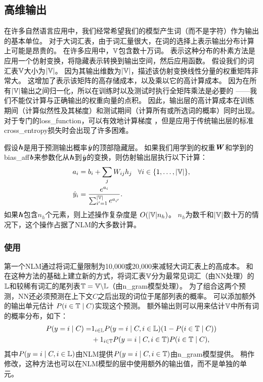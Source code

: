 \subsection{高维输出}
\label{sec:high_dimensional_outputs}

在许多自然语言应用中，我们经常希望我们的模型产生词（而不是字符）作为输出的基本单位。
对于大词汇表，由于词汇量很大，在词的选择上表示输出分布计算上可能是昂贵的。
在许多应用中，$\mathbb{V}$包含数十万词。
表示这种分布的朴素方法是应用一个仿射变换，将隐藏表示转换到输出空间，然后应用函数。
假设我们的词汇表$\mathbb{V}$大小为$| \mathbb{V} |$。
因为其输出维数为$| \mathbb{V} |$，描述该仿射变换线性分量的权重矩阵非常大。
这增加了表示该矩阵的高存储成本，以及乘以它的高计算成本。
因为在所有$| \mathbb{V} |$输出之间归一化，所以在训练时以及测试时执行全矩阵乘法是必要的 ——我们不能仅计算与正确输出的权重向量的点积。
因此，输出层的高计算成本在训练期间（计算似然性及其梯度）和测试期间（计算所有或所选词的概率）同时出现。
对于专门的\gls{loss_function}，可以有效地计算梯度 \citep{Vincent2015}，但是应用于传统输出层的标准\gls{cross_entropy}损失时会出现了许多困难。

假设$\boldsymbol{\mathit{h}}$是用于预测输出概率$\hat {\boldsymbol{\mathit{y}}}$的顶部隐藏层。
如果我们用学到的权重$\boldsymbol{\mathit{W}}$和学到的\gls{bias_aff}$\boldsymbol{\mathit{b}}$来参数化从$\boldsymbol{\mathit{h}}$到$\hat {\boldsymbol{\mathit{y}}}$的变换，则仿射输出层执行以下计算：
\begin{align}
\label{eq:softmax-over-words}
  a_i &= b_i + \sum_j  W_{ij} h_j \;\;\; \forall i \in \{1,\ldots,|\mathbb{V}|\}, \\
  \hat{y}_i &= \frac{e^{a_i}}{\sum_{i'=1}^{|\mathbb{V}|} e^{a_{i'}}}.
\end{align}
如果$\boldsymbol{\mathit{h}}$包含$n_h$个元素，则上述操作复杂度是 $O(|\mathbb{V}| n_h)$。
$n_h$为数千和$| \mathbb{V} |$数十万的情况下，这个操作占据了\gls{NLM}的大多数计算。


\subsubsection{使用}
第一个\gls{NLM}\citep{BenDucVin01-small,Bengio-nnlm2003-small}通过将词汇量限制为10,000或20,000来减轻大词汇表上的高成本。
\citet{Schwenk+Gauvain2002}和 \citet{Schwenk-2007}在这种方法的基础上建立新的方式，将词汇表$\mathbb{V}$分为最常见词汇（由\gls{NN}处理）的~$\mathbb{L}$和较稀有词汇的尾列表$\mathbb{T} = \mathbb{V} \backslash \mathbb{L}$（由\gls{n_gram}模型处理）。
为了组合这两个预测，\gls{NN}还必须预测在上下文$C$之后出现的词位于尾部列表的概率。
可以添加额外的输出单元估计 $P(i \in \mathbb{T} \mid C)$实现这个预测。
额外输出则可以用来估计$\mathbb{V}$中所有词的概率分布，如下：
\begin{align}
 P(y=i\mid C)  =& 1_{i \in \mathbb{L}} P(y=i\mid C, i \in \mathbb{L}) (1 - P(i \in \mathbb{T}\mid C)) \nonumber \\
     & + 1_{i \in \mathbb{T}} P(y=i\mid C, i \in \mathbb{T}) P(i \in \mathbb{T}\mid C),
\end{align}
其中$P(y=i\mid C, i \in \mathbb{L})$由\gls{NLM}提供$P(y=i\mid C, i \in \mathbb{T})$由\gls{n_gram}模型提供。
稍作修改，这种方法也可以在\gls{NLM}模型的层中使用额外的输出值，而不是单独的单元。

